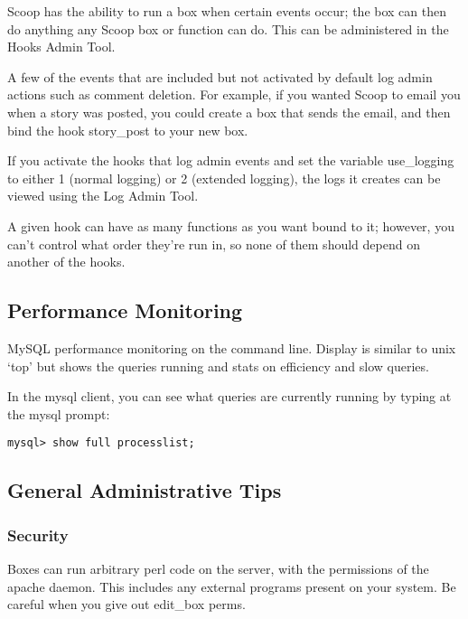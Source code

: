 Scoop has the ability to run a box when certain events occur; the box can then do anything any Scoop box or function can do.  This can be administered in the Hooks Admin Tool.

A few of the events that are included but not activated by default log admin actions such as comment deletion.  For example, if you wanted Scoop to email you when a story was posted, you could create a box that sends the email, and then bind the hook story\_post to your new box.

If you activate the hooks that log admin events and set the variable use\_logging to either 1 (normal logging) or 2 (extended logging), the logs it creates can be viewed using the Log Admin Tool.

A given hook can have as many functions as you want bound to it; however, you can't control what order they're run in, so none of them should depend on another of the hooks.

\subsection{Performance Monitoring}
\label{performance}

 MySQL performance monitoring on the command line. Display is similar to unix `top' but shows the queries running and stats on efficiency and slow queries.

In the mysql client, you can see what queries are currently running by typing at the mysql prompt:
\begin{verbatim}
mysql> show full processlist;
\end{verbatim}


\subsection{General Administrative Tips}
\label{admin-general}

\subsubsection{Security}

Boxes can run arbitrary perl code on the server, with the permissions of the apache daemon. This includes any external programs present on your system. Be careful when you give out edit\_box perms.

